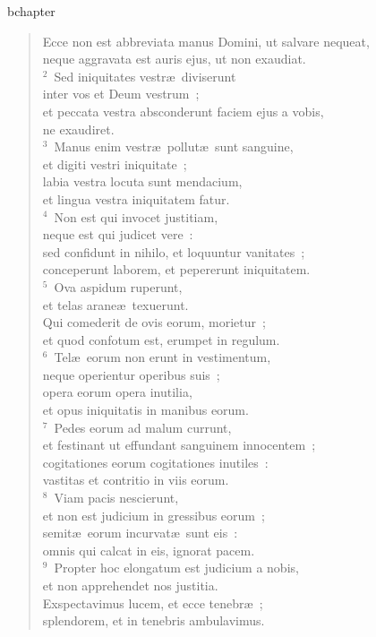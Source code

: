 bchapter\begin{verse}\vspace{-19pt}Ecce non est abbreviata manus Domini, ut salvare nequeat,\\ neque aggravata est auris ejus, ut non exaudiat.\\
${}^{2}$~Sed iniquitates vestr\ae\ diviserunt\\ inter vos et Deum vestrum~;\\ et peccata vestra absconderunt faciem ejus a vobis,\\ ne exaudiret.\\
${}^{3}$~Manus enim vestr\ae\ pollut\ae\ sunt sanguine,\\ et digiti vestri iniquitate~;\\ labia vestra locuta sunt mendacium,\\ et lingua vestra iniquitatem fatur.\\
${}^{4}$~Non est qui invocet justitiam,\\ neque est qui judicet vere~:\\ sed confidunt in nihilo, et loquuntur vanitates~;\\ conceperunt laborem, et pepererunt iniquitatem.\\
${}^{5}$~Ova aspidum ruperunt,\\ et telas arane\ae\ texuerunt.\\ Qui comederit de ovis eorum, morietur~;\\ et quod confotum est, erumpet in regulum.\\
${}^{6}$~Tel\ae\ eorum non erunt in vestimentum,\\ neque operientur operibus suis~;\\ opera eorum opera inutilia,\\ et opus iniquitatis in manibus eorum.\\
${}^{7}$~Pedes eorum ad malum currunt,\\ et festinant ut effundant sanguinem innocentem~;\\ cogitationes eorum cogitationes inutiles~:\\ vastitas et contritio in viis eorum.\\
${}^{8}$~Viam pacis nescierunt,\\ et non est judicium in gressibus eorum~;\\ semit\ae\ eorum incurvat\ae\ sunt eis~:\\ omnis qui calcat in eis, ignorat pacem.\\
${}^{9}$~Propter hoc elongatum est judicium a nobis,\\ et non apprehendet nos justitia.\\ Exspectavimus lucem, et ecce tenebr\ae~;\\ splendorem, et in tenebris ambulavimus.\\

\end{verse}
